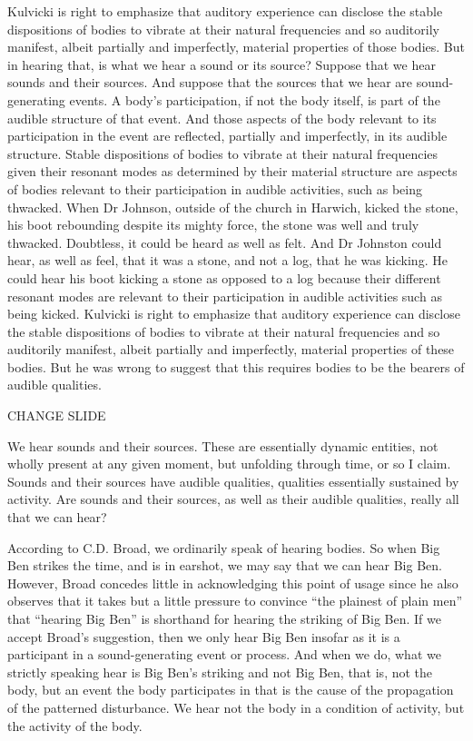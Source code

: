 \documentclass[12pt]{article}
\begin{document}
Kulvicki is right to emphasize that auditory experience can disclose the stable dispositions of bodies to vibrate at their natural frequencies and so auditorily manifest, albeit partially and imperfectly, material properties of those bodies. But in hearing that, is what we hear a sound or its source? Suppose that we hear sounds and their sources. And suppose that the sources that we hear are sound-generating events. A body’s participation, if not the body itself, is part of the audible structure of that event. And those aspects of the body relevant to its participation in the event are reflected, partially and imperfectly, in its audible structure. Stable dispositions of bodies to vibrate at their natural frequencies given their resonant modes as determined by their material structure are aspects of bodies relevant to their participation in audible activities, such as being thwacked. When Dr Johnson, outside of the church in Harwich, kicked the stone, his boot rebounding despite its mighty force, the stone was well and truly thwacked. Doubtless, it could be heard as well as felt. And Dr Johnston could hear, as well as feel, that it was a stone, and not a log, that he was kicking. He could hear his boot kicking a stone as opposed to a log because their different resonant modes are relevant to their participation in audible activities such as being kicked. Kulvicki is right to emphasize that auditory experience can disclose the stable dispositions of bodies to vibrate at their natural frequencies and so auditorily manifest, albeit partially and imperfectly, material properties of these bodies. But he was wrong to suggest that this requires bodies to be the bearers of audible qualities. 

CHANGE SLIDE

We hear sounds and their sources. These are essentially dynamic entities, not wholly present at any given moment, but unfolding through time, or so I claim. Sounds and their sources have audible qualities, qualities essentially sustained by activity. Are sounds and their sources, as well as their audible qualities, really all that we can hear?

According to C.D. Broad, we ordinarily speak of hearing bodies. So when Big Ben strikes the time, and is in earshot, we may say that we can hear Big Ben. However, Broad concedes little in acknowledging this point of usage since he also observes that it takes but a little pressure to convince “the plainest of plain men” that “hearing Big Ben” is shorthand for hearing the striking of Big Ben. If we accept Broad’s suggestion, then we only hear Big Ben insofar as it is a participant in a sound-generating event or process. And when we do, what we strictly speaking hear is Big Ben’s striking and not Big Ben, that is, not the body, but an event the body participates in that is the cause of the propagation of the patterned disturbance. We hear not the body in a condition of activity, but the activity of the body.
\end{document}
